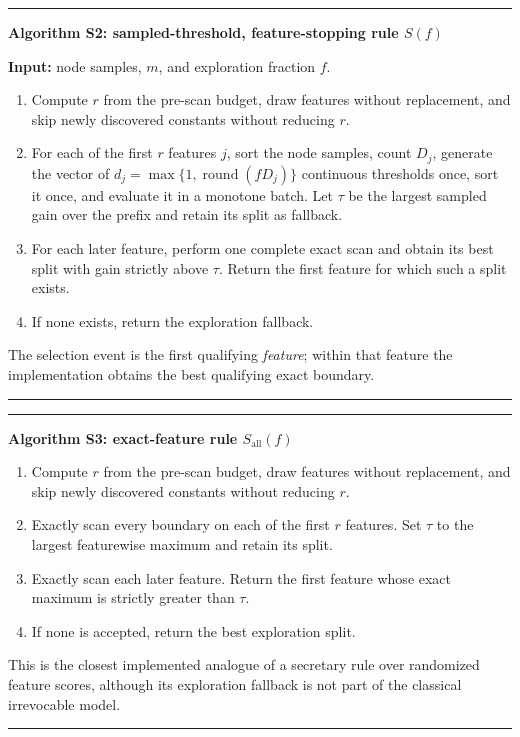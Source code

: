 \documentclass[final,5p,times,twocolumn]{elsarticle}
\newenvironment{suppalgorithm}[1]{%
  \par\medskip\noindent\begin{minipage}{\columnwidth}\small
  \hrule\smallskip\textbf{#1}\par\smallskip
}{%
  \smallskip\hrule\end{minipage}\par\medskip
}
\begin{document}
\begin{suppalgorithm}{Algorithm S2: sampled-threshold, feature-stopping rule \(S(f)\)}
\textbf{Input:} node samples, \(m\), and exploration fraction \(f\).
\begin{enumerate}
\setlength{\itemsep}{0pt}
\item Compute \(r\) from the pre-scan budget, draw features without replacement,
      and skip newly discovered constants without reducing \(r\).
\item For each of the first \(r\) features \(j\), sort the node samples, count
      \(D_j\), generate the vector of
      \(d_j=\max\{1,\operatorname{round}(fD_j)\}\) continuous thresholds once,
      sort it once, and evaluate it in a monotone batch.  Let \(\tau\) be the
      largest sampled gain over the prefix and retain its split as fallback.
\item For each later feature, perform one complete exact scan and obtain its
      best split with gain strictly above \(\tau\).  Return the first feature
      for which such a split exists.
\item If none exists, return the exploration fallback.
\end{enumerate}
The selection event is the first qualifying \emph{feature}; within that
feature the implementation obtains the best qualifying exact boundary.
\end{suppalgorithm}

\begin{suppalgorithm}{Algorithm S3: exact-feature rule \(S_{\mathrm{all}}(f)\)}
\begin{enumerate}
\setlength{\itemsep}{0pt}
\item Compute \(r\) from the pre-scan budget, draw features without replacement,
      and skip newly discovered constants without reducing \(r\).
\item Exactly scan every boundary on each of the first \(r\) features.  Set
      \(\tau\) to the largest featurewise maximum and retain its split.
\item Exactly scan each later feature.  Return the first feature whose exact
      maximum is strictly greater than \(\tau\).
\item If none is accepted, return the best exploration split.
\end{enumerate}
This is the closest implemented analogue of a secretary rule over randomized
feature scores, although its exploration fallback is not part of the classical
irrevocable model.
\end{suppalgorithm}
\end{document}
